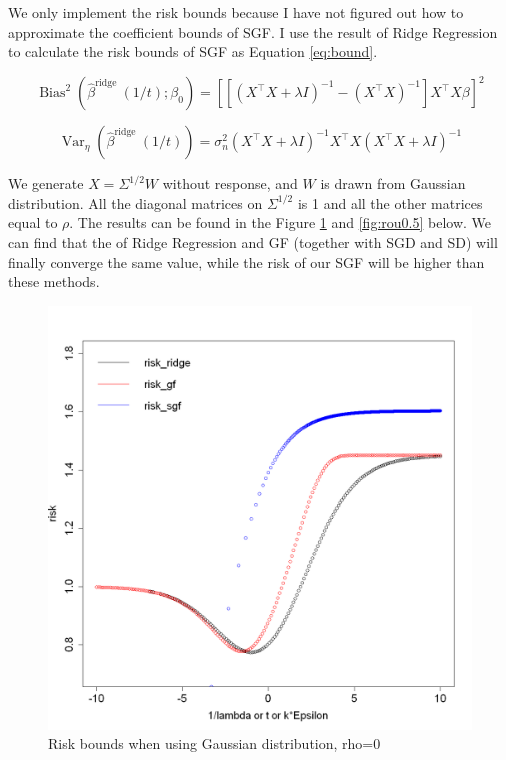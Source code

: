 \documentclass[11pt]{article}
\begin{document}
We only implement the risk bounds because I have not figured out how to approximate the coefficient bounds of SGF. I use the result of Ridge Regression to calculate the risk bounds of SGF as Equation \ref{eq:bound}.

\begin{equation}
    \operatorname{Bias}^{2}\left(\hat{\beta}^{\text {ridge }}(1 / t) ; \beta_{0}\right) = \left[\left[\left(X^{\top} X+\lambda I\right)^{-1}-\left(X^{\top} X\right)^{-1}\right] X^{\top} X \beta\right]^2
\end{equation}

\begin{equation}
    \operatorname{Var}_{\eta}\left(\hat{\beta}^{\text {ridge }}(1 / t)\right) = \sigma_n^{2}\left(X^{\top} X+\lambda I\right)^{-1} X^{\top} X\left(X^{\top} X+\lambda I\right)^{-1}
\end{equation}

We generate $X=\Sigma^{1 / 2} W$ without response, and $W$ is drawn from Gaussian distribution. All the diagonal matrices on $\Sigma^{1 / 2}$ is 1 and all the other matrices equal to $\rho$.
The results can be found in the Figure \ref{fig:rou0} and \ref{fig:rou0.5} below. We can find that the of Ridge Regression and GF (together with SGD and SD) will finally converge the same value, while the risk of our SGF will be higher than these methods.

\begin{figure}[h]
\centering
\includegraphics[width=0.9\linewidth]{fig8.png}
\caption{Risk bounds when using Gaussian distribution, rho=0}
\label{fig:rou0}
\end{figure}
\end{document}
